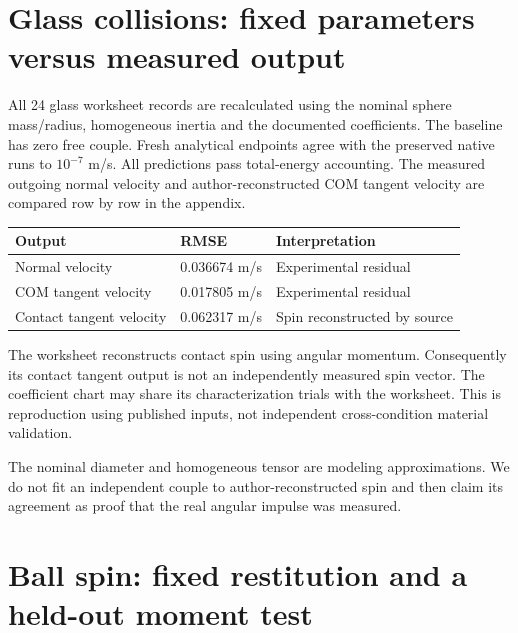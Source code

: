 \documentclass[10pt,a4paper]{article}
\begin{document}
\newpage
\section*{Glass collisions: fixed parameters versus measured output}

All 24 glass worksheet records are recalculated using the nominal sphere mass/radius,
homogeneous inertia and the documented coefficients. The baseline has zero free couple.
Fresh analytical endpoints agree with the preserved native runs to $10^{-7}$ m/s.
All predictions pass total-energy accounting. The measured outgoing normal velocity
and author-reconstructed COM tangent velocity are compared row by row in the appendix.
\begin{center}\footnotesize\setlength{\tabcolsep}{4pt}
\begin{tabular}{lll}
\hline
Output & RMSE & Interpretation\\\hline
Normal velocity & 0.036674 m/s & Experimental residual\\
COM tangent velocity & 0.017805 m/s & Experimental residual\\
Contact tangent velocity & 0.062317 m/s & Spin reconstructed by source\\
\hline\end{tabular}\end{center}
The worksheet reconstructs contact spin using angular momentum. Consequently its
contact tangent output is not an independently measured spin vector. The coefficient
chart may share its characterization trials with the worksheet. This is reproduction
using published inputs, not independent cross-condition material validation.

The nominal diameter and homogeneous tensor are modeling approximations. We do not
fit an independent couple to author-reconstructed spin and then claim its agreement
as proof that the real angular impulse was measured.

\newpage
\section*{Ball spin: fixed restitution and a held-out moment test}
\end{document}
